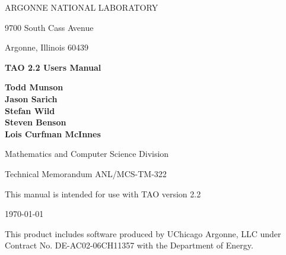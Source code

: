 
\vspace{1.75in}

\begin{center}

ARGONNE NATIONAL LABORATORY

9700 South Cass Avenue

Argonne, Illinois  60439

\vspace{1.5in}

{\Large
{\bf 
TAO 2.2 Users Manual
}
}

\vspace{.5in}

{\bf Todd Munson \\ Jason Sarich \\ Stefan Wild \\ Steven Benson \\ Lois Curfman McInnes}

\vspace{.5in}

Mathematics and Computer Science Division

\vspace{.25in}

Technical Memorandum ANL/MCS-TM-322

\vspace{.25in}

This manual is intended for use with TAO version 2.2

\vspace{1.0in}

\today
\end{center}

\vspace{0.75in}

\par\noindent
This product includes software produced by UChicago Argonne, LLC under 
Contract No. DE-AC02-06CH11357 with the Department of Energy.
